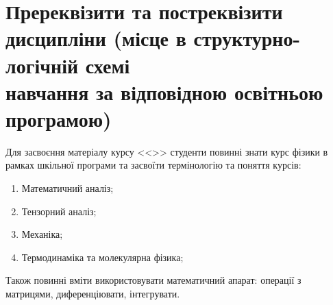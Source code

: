 \documentclass{Syllabus}
\begin{document}
\begin{enumerate}
\end{enumerate}


\section{Пререквізити та постреквізити дисципліни (місце в структурно-логічній схемі\\ навчання за відповідною освітньою програмою)}


Для засвоєння матеріалу курсу <<\discipline>> студенти повинні знати курс фізики в рамках шкільної програми та засвоїти термінологію та поняття курсів:
\begin{enumerate}
    \item Математичний аналіз;
    \item Тензорний аналіз;
    \item Механіка;
    \item Термодинаміка та молекулярна фізика;
\end{enumerate}

Також повинні вміти використовувати математичний апарат: операції з матрицями,  диференціювати, інтегрувати. 
\end{document}
